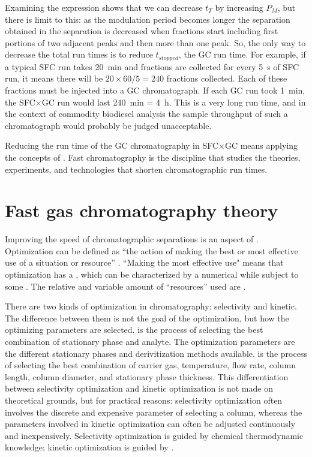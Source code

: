 Examining the expression shows that we can decrease \(t_T\) by increasing
\(P_M\), but there is limit to this: as the modulation period becomes longer the
separation obtained in the \oneD separation is decreased when fractions start
including first portions of two adjacent peaks and then more than one peak. So,
the only way to decrease the total run times is to reduce \(t_{stopped}\), the
GC run time. For example, if a typical SFC run takes \SI{20}{\minute} and fractions are
collected for every \SI{5}{\second} of SFC run, it means there will be \( 20
\times 60 / 5 = 240 \) fractions collected. Each of these fractions must be
injected into a GC chromatograph. If each GC run took \SI{1}{\minute}, the
SFC×GC run would last \SI{240}{\minute} = \SI{4}{\hour}. This is a very long run
time, and in the context of commodity biodiesel analysis the sample throughput
of such a chromatograph would probably be judged unacceptable.

Reducing the run time of the \twoD GC chromatography in SFC×GC means applying
the concepts of . Fast chromatography is the
discipline that studies the theories, experiments, and technologies that shorten
chromatographic run times.

\section{Fast gas chromatography theory}

Improving the speed of chromatographic separations is an aspect of
. Optimization can be defined as ``the action of making
the best or most effective use of a situation or resource'' \autocite{OUP2019}.
``Making the most effective use" means that optimization has a
, which can be characterized by a numerical 
while subject to some . The relative and variable amount
of ``resources'' used are .

There are two kinds of optimization in chromatography: selectivity and kinetic.
The difference between them is not the goal of the optimization, but how the
optimizing parameters are selected.  is the
process of selecting the best combination of stationary phase and analyte. The
optimization parameters are the different stationary phases and derivitization
methods available.  is the process of selecting
the best combination of carrier gas, temperature, flow rate, column length,
column diameter, and stationary phase thickness. This differentiation between
selectivity optimization and kinetic optimization is not made on theoretical
grounds, but for practical reasons: selectivity optimization often involves the
discrete and expensive parameter of selecting a column, whereas the parameters
involved in kinetic optimization can often be adjusted continuously and
inexpensively. Selectivity optimization is guided by chemical thermodynamic
knowledge; kinetic optimization is guided by .


